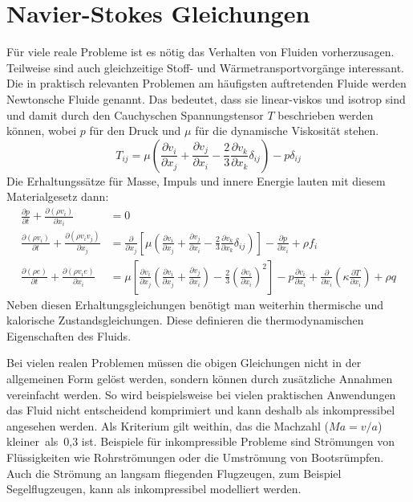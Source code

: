 \section{Navier-Stokes Gleichungen}

Für viele reale Probleme ist es nötig das Verhalten von Fluiden vorherzusagen.
Teilweise sind auch gleichzeitige Stoff- und Wärmetransportvorgänge interessant.
Die in praktisch relevanten Problemen am häufigsten auftretenden Fluide werden Newtonsche Fluide genannt.
Das bedeutet, dass sie linear-viskos und isotrop sind und damit durch den Cauchyschen
Spannungstensor $T$ beschrieben werden können, wobei $p$ für den Druck und $\mu$ für die dynamische Viskosität stehen.
\begin{equation}
  T_{ij} = \mu\left({\frac{\partial v_i}{\partial x_j}
  + \frac{\partial v_j}{\partial x_i}
-\frac{2}{3} \frac{\partial v_k}{\partial x_k} \delta_{ij}}\right)
-p\delta_{ij}
\end{equation}
Die
Erhaltungssätze für Masse, Impuls und innere Energie lauten mit diesem Materialgesetz dann:
\begin{align}
  \frac{\partial p}{\partial t} + \frac{\partial (\rho v_i)}{\partial x_i} &= 0\\
  \frac{\partial (\rho v_i)}{\partial t} + \frac{\partial (\rho v_i v_j)}{\partial x_j} &=
  \frac{\partial}{\partial x_j} \left[{\mu
  \left({\frac{\partial v_i}{\partial x_j}
  +\frac{\partial v_j}{\partial x_i}
  - \frac{2}{3} \frac{\partial v_k}{\partial x_k}\delta_{ij}}\right)}\right]
  -\frac{\partial p}{\partial x_i} + \rho f_i\\
  \frac{\partial (\rho e)}{\partial t} + \frac{\partial (\rho v_i e)}{\partial x_i} &=
  \mu \left[{\frac{\partial v_i}{\partial x_j}
  \left({\frac{\partial v_i}{\partial x_j}
  +\frac{\partial v_j}{\partial x_i}}\right)
  - \frac{2}{3} \left({\frac{\partial v_i}{\partial x_i}}\right)^2}\right]
  -p\frac{\partial v_i}{\partial x_i} +\frac{\partial}{\partial x_i}
  \left({\kappa \frac{\partial T}{\partial x_i}}\right)
  + \rho q
\end{align}
Neben diesen Erhaltungsgleichungen benötigt man weiterhin thermische und kalorische Zustands\-gleich\-ungen.
Diese definieren die thermodynamischen Eigenschaften des Fluids.

Bei
vielen realen Problemen müssen die obigen Gleichungen nicht in der allgemeinen Form gelöst werden, sondern
können durch zusätzliche Annahmen vereinfacht werden.
So wird beispielsweise bei vielen praktischen Anwendungen das Fluid nicht entscheidend komprimiert
und kann deshalb als inkompressibel angesehen werden. Als Kriterium gilt weithin,
das die Machzahl ($Ma = v/a$) kleiner~als~0,3 ist. Beispiele für inkompressible Probleme
sind Strömungen von Flüssigkeiten wie Rohrströmungen oder die Umströmung von Bootsrümpfen.
Auch die Strömung an langsam fliegenden Flugzeugen, zum Beispiel Segelflugzeugen, kann als
inkompressibel modelliert werden.

